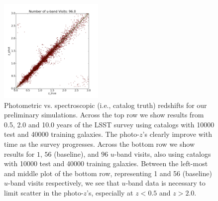 \begin{figure}[h]
\begin{center}
\includegraphics[width=5cm]{figs/photoz/uvisits_cat6.png}
\caption{Photometric vs. spectroscopic (i.e., catalog truth) redshifts
for our preliminary simulations. Across the top row we show results from
0.5, 2.0 and 10.0 years of the LSST survey using catalogs with 10000 test
and 40000 training galaxies. The photo-$z$'s clearly improve with time
as the survey progresses. Across the bottom row we show results for $1$,
$56$ (baseline), and $96$ $u$-band visits, also using catalogs with 10000 test
and 40000 training galaxies. Between the left-most and middle plot of
the bottom row, representing 1 and 56 (baseline) $u$-band visits
respectively, we see that $u$-band data is necessary to limit scatter in
the photo-$z$'s, especially at $z<0.5$ and $z>2.0$.
\label{fig:redshifts}}
\end{center}
\end{figure}

